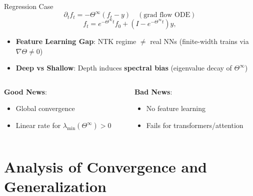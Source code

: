 \documentclass[serif, aspectratio=169]{beamer}
\begin{document}
\begin{frame}{Regression Case}
	\[
	\partial_t f_t = -\Theta^\infty(f_t - y) \quad (\text{grad flow ODE})
	\]
	\[
	f_t = e^{-\Theta^\infty t} f_0 + \left(I - e^{-\Theta^\infty t}\right) y,
	\]
	
	\begin{itemize}
		\item \textbf{Feature Learning Gap}: NTK regime \(\neq\) real NNs (finite-width trains via \(\nabla\Theta \neq 0\))
		\item \textbf{Deep vs Shallow}: Depth induces \textbf{spectral bias} (eigenvalue decay of \(\Theta^\infty\))
	\end{itemize}
	
	\vspace{1em}
	\begin{columns}
		\begin{column}{0.5\textwidth}
			\textbf{Good News}:
			\begin{itemize}
				\item Global convergence
				\item Linear rate for \(\lambda_{\min}(\Theta^\infty) > 0\)
			\end{itemize}
		\end{column}
		\begin{column}{0.5\textwidth}
			\textbf{Bad News}:
			\begin{itemize}
				\item No feature learning
				\item Fails for transformers/attention
			\end{itemize}
		\end{column}
	\end{columns}
\end{frame}

\section{Analysis of Convergence and Generalization}
\end{document}
